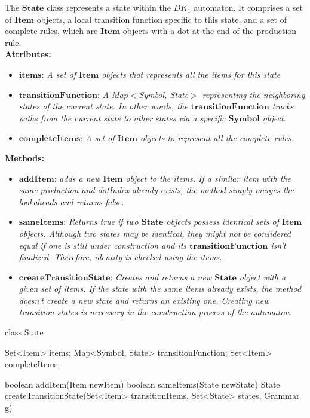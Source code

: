 The \(\boldsymbol{State}\) class represents a state within the \(DK_{1}\) automaton. It comprises a set of \(\boldsymbol{Item}\) objects, a local transition function specific to this state, and a set of complete rules, which are \(\boldsymbol{Item}\) objects with a dot at the end of the production rule.\\

\textbf{Attributes:}
\begin{itemize}
    \item \(\boldsymbol{items}\): \textit{A set of \(\boldsymbol{Item}\) objects that represents all the items for this state}
    \item \(\boldsymbol{transitionFunction}\): \textit{A Map\(<\)Symbol, State\(>\) representing the neighboring states of the current state. In other words, the \(\boldsymbol{transitionFunction}\) tracks paths from the current state to other states via a specific \(\boldsymbol{Symbol}\) object.}
    \item \(\boldsymbol{completeItems}\): \textit{A set of \(\boldsymbol{Item}\) objects to represent all the complete rules.}
\end{itemize}

\textbf{Methods:}
\begin{itemize}
    \item \(\boldsymbol{addItem}\): \textit{adds a new \(\boldsymbol{Item}\) object to the items. If a similar item with the same production and dotIndex already exists, the method simply merges the lookaheads and returns false.}
    \item \(\boldsymbol{sameItems}\): \textit{Returns true if two \(\boldsymbol{State}\) objects possess identical sets of \(\boldsymbol{Item}\) objects. Although two states may be identical, they might not be considered equal if one is still under construction and its \(\boldsymbol{transitionFunction}\) isn’t finalized. Therefore, identity is checked using the items.}
    \item \(\boldsymbol{createTransitionState}\): \textit{Creates and returns a new \(\boldsymbol{State}\) object with a given set of items. If the state with the same items already exists, the method doesn’t create a new state and returns an existing one. Creating new transition states is necessary in the construction process of the automaton.}
\end{itemize}

\begin{codeblock}
    class State {
        Set<Item> items;
        Map<Symbol, State> transitionFunction;
        Set<Item> completeItems;

        boolean addItem(Item newItem) {}
        boolean sameItems(State newState) {}
        State createTransitionState(Set<Item> transitionItems, Set<State> states, Grammar g) {}
    }
\end{codeblock}

